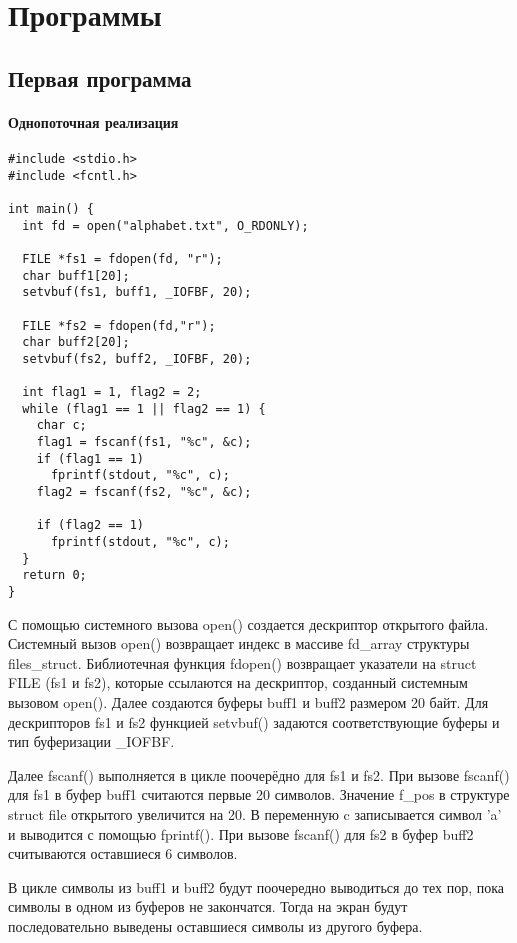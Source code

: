 \chapter{Программы}

\section{Первая программа}


\subsubsection{Однопоточная реализация}
\begin{lstlisting}
#include <stdio.h>
#include <fcntl.h>

int main() {
  int fd = open("alphabet.txt", O_RDONLY);

  FILE *fs1 = fdopen(fd, "r");
  char buff1[20];
  setvbuf(fs1, buff1, _IOFBF, 20);

  FILE *fs2 = fdopen(fd,"r");
  char buff2[20];
  setvbuf(fs2, buff2, _IOFBF, 20);

  int flag1 = 1, flag2 = 2;
  while (flag1 == 1 || flag2 == 1) {
    char c;
    flag1 = fscanf(fs1, "%c", &c);
    if (flag1 == 1)
      fprintf(stdout, "%c", c);
    flag2 = fscanf(fs2, "%c", &c);

    if (flag2 == 1)
      fprintf(stdout, "%c", c);
  }
  return 0;
}
\end{lstlisting}

С помощью системного вызова open() создается дескриптор открытого
файла. Системный вызов open() возвращает индекс в массиве fd\_array структуры files\_struct. Библиотечная функция fdopen() возвращает указатели на struct FILE (fs1 и fs2), которые ссылаются на дескриптор, созданный
системным вызовом open(). Далее создаются буферы buff1 и buff2 размером 20
байт. Для дескрипторов fs1 и fs2 функцией setvbuf() задаются соответствующие
буферы и тип буферизации \_IOFBF.

Далее fscanf() выполняется в цикле поочерёдно для fs1 и fs2. При
вызове fscanf() для fs1 в буфер buff1 считаются первые 20 символов. Значение f\_pos в структуре struct file открытого увеличится на 20. В переменную c
записывается символ 'a' и выводится с помощью fprintf(). При вызове fscanf() для fs2 в буфер buff2 считываются оставшиеся 6 символов.

В цикле символы из buff1 и buff2 будут поочередно выводиться до тех
пор, пока символы в одном из буферов не закончатся. Тогда на экран будут 
последовательно выведены оставшиеся символы из другого буфера.

